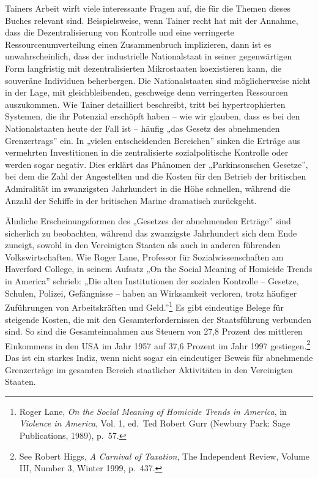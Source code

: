 \documentclass[
  a5paper,
  smalldemyvopaper,10pt,twoside,onecolumn,openright,extrafontsizes,hidelinks]{memoir}
\begin{document}
Tainers Arbeit wirft viele interessante Fragen auf, die für die Themen
dieses Buches relevant sind. Beispielsweise, wenn Tainer recht hat mit
der Annahme, dass die Dezentralisierung von Kontrolle und eine
verringerte Ressourcenumverteilung einen Zusammenbruch implizieren, dann
ist es unwahrscheinlich, dass der industrielle Nationalstaat in seiner
gegenwärtigen Form langfristig mit dezentralisierten Mikrostaaten
koexistieren kann, die souveräne Individuen beherbergen. Die
Nationalstaaten sind möglicherweise nicht in der Lage, mit
gleichbleibenden, geschweige denn verringerten Ressourcen auszukommen.
Wie Tainer detailliert beschreibt, tritt bei hypertrophierten Systemen,
die ihr Potenzial erschöpft haben -- wie wir glauben, dass es bei den
Nationalstaaten heute der Fall ist -- häufig „das Gesetz des abnehmenden
Grenzertrags'' ein. In „vielen entscheidenden Bereichen'' sinken die
Erträge aus vermehrten Investitionen in die zentralisierte
sozialpolitische Kontrolle oder werden sogar negativ. Dies erklärt das
Phänomen der „Parkinsonschen Gesetze'', bei dem die Zahl der
Angestellten und die Kosten für den Betrieb der britischen Admiralität
im zwanzigsten Jahrhundert in die Höhe schnellen, während die Anzahl der
Schiffe in der britischen Marine dramatisch zurückgeht.

Ähnliche Erscheinungsformen des „Gesetzes der abnehmenden Erträge'' sind
sicherlich zu beobachten, während das zwanzigste Jahrhundert sich dem
Ende zuneigt, sowohl in den Vereinigten Staaten als auch in anderen
führenden Volkswirtschaften. Wie Roger Lane, Professor für
Sozialwissenschaften am Haverford College, in seinem Aufsatz „On the
Social Meaning of Homicide Trends in America'' schrieb: „Die alten
Institutionen der sozialen Kontrolle -- Gesetze, Schulen, Polizei,
Gefängnisse -- haben an Wirksamkeit verloren, trotz häufiger Zuführungen
von Arbeitskräften und Geld.''\footnote{Roger Lane, \emph{On the Social
  Meaning of Homicide Trends in America}, in \emph{Violence in America},
  Vol. 1, ed.~Ted Robert Gurr (Newbury Park: Sage Publications, 1989),
  p.~57.} Es gibt eindeutige Belege für steigende Kosten, die mit den
Gesamterfordernissen der Staatsführung verbunden sind. So sind die
Gesamteinnahmen aus Steuern von 27,8 Prozent des mittleren Einkommens in
den USA im Jahr 1957 auf 37,6 Prozent im Jahr 1997 gestiegen.\footnote{See
  Robert Higgs, \emph{A Carnival of Taxation}, The Independent Review,
  Volume III, Number 3, Winter 1999, p.~437.} Das ist ein starkes Indiz,
wenn nicht sogar ein eindeutiger Beweis für abnehmende Grenzerträge im
gesamten Bereich staatlicher Aktivitäten in den Vereinigten Staaten.
\end{document}
